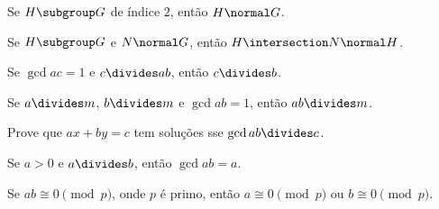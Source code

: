 \begin{exercise}
	Se $H \subgroup G$ de índice $2$, então $H \normal G$.
\end{exercise}

\begin{exercise}
	Se $H \subgroup G$ e $N \normal G$, então $H \intersection N \normal H$. 
\end{exercise}

\begin{exercise}
	Se $\gcd a c = 1$ e $c \divides ab$, então $c \divides b$.
\end{exercise}

\begin{exercise}
	Se $a \divides m$, $b \divides m$ e $\gcd a b = 1$, então $ab \divides m$.
\end{exercise}

\begin{exercise}
	Prove que $ax + by = c$ tem soluções sse $\gcd a b \divides c$.
\end{exercise}

\begin{exercise}
	Se $a > 0$ e $a \divides b$, então $\gcd a b = a$.
\end{exercise}

\begin{exercise}
	Se $ab \cong 0 \pmod p$, onde $p$ é primo, então $a \cong 0 \pmod p$ ou $b \cong 0 \pmod p$.
\end{exercise}
